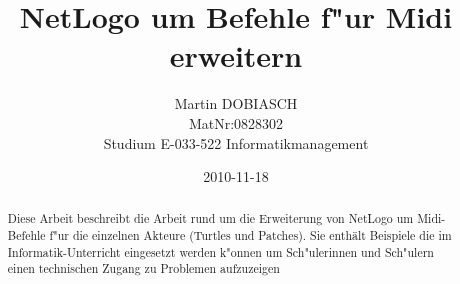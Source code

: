 \documentclass[10pt,parskip]{scrartcl}
\begin{document}
\subject{Bakkalaureatsarbeit}
\author{Martin DOBIASCH \\MatNr:0828302\\Studium E-033-522 Informatikmanagement}
\title{NetLogo um Befehle f"ur Midi erweitern}
\date{2010-11-18}



\begin{abstract}
Diese Arbeit beschreibt die Arbeit rund um die Erweiterung von NetLogo \cite{NetLogo} um 
Midi-Befehle f"ur die einzelnen Akteure (Turtles und Patches). 
Sie enthält Beispiele die im Informatik-Unterricht eingesetzt werden k"onnen
um Sch"ulerinnen und Sch"ulern einen technischen Zugang zu Problemen 
aufzuzeigen

\end{abstract}

\tableofcontents
\newpage








% 



\end{document}
